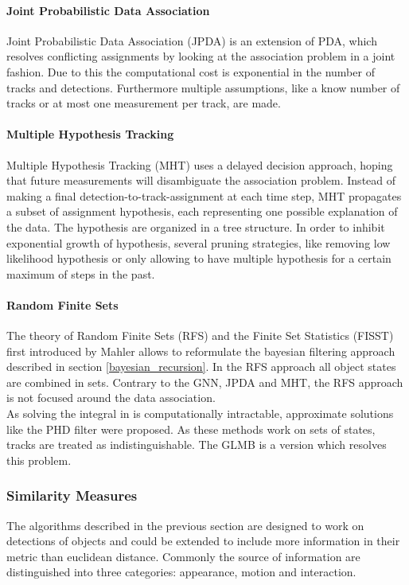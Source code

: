 \documentclass[12pt,a4paper]{article}
\begin{document}
\paragraph{Joint Probabilistic Data Association} Joint Probabilistic Data Association (JPDA) is an extension of PDA, which resolves conflicting assignments by looking at the association problem in a joint fashion. Due to this the computational cost is exponential in the number of tracks and detections. Furthermore multiple assumptions, like a know number of tracks or at most one measurement per track, are made. 
\paragraph{Multiple Hypothesis Tracking} Multiple Hypothesis Tracking (MHT) uses a delayed decision approach, hoping that future measurements will disambiguate the association problem. Instead of making a final detection-to-track-assignment at each time step, MHT propagates a subset of assignment hypothesis, each representing one possible explanation of the data. The hypothesis are organized in a tree structure. In order to inhibit exponential growth of hypothesis, several pruning strategies, like removing low likelihood hypothesis or only allowing to have multiple hypothesis for a certain maximum of steps in the past. 

\paragraph{Random Finite Sets} The theory of Random Finite Sets (RFS) and the Finite Set Statistics (FISST) first introduced by Mahler %
allows to reformulate the bayesian filtering approach described in section \ref{bayesian_recursion}. In the RFS approach all object states are combined in sets. Contrary to the GNN, JPDA and MHT, the RFS approach is not focused around the data association.\\
 As solving the integral in %
is computationally intractable, approximate solutions like the PHD filter were proposed. %
As these methods work on sets of states, tracks are treated as indistinguishable. The GLMB %
is a version which resolves this problem.

\subsubsection{Similarity Measures} 
The algorithms described in the previous section are designed to work on detections of objects and could be extended to include more information in their metric than euclidean distance. Commonly the source of information are distinguished into three categories: appearance, motion and interaction. 
\end{document}
